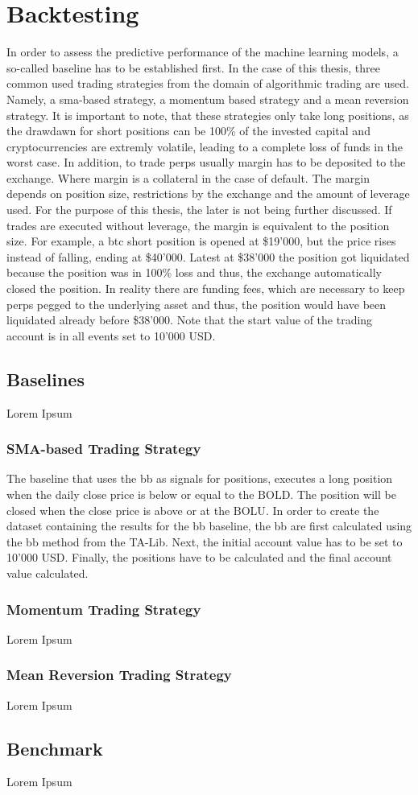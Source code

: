 \section{Backtesting}
\label{sec:Backtesting}
In order to assess the predictive performance of the machine learning models, a so-called baseline has to be established first. In the case of this thesis, three common used trading strategies from the domain of algorithmic trading are used. Namely, a sma-based strategy, a momentum based strategy and a mean reversion strategy. It is important to note, that these strategies only take long positions, as the drawdawn for short positions can be 100\% of the invested capital and cryptocurrencies are extremly volatile, leading to a complete loss of funds in the worst case. In addition, to trade perps usually margin has to be deposited to the exchange. Where margin is a collateral in the case of default. The margin depends on position size, restrictions by the exchange and the amount of leverage used. For the purpose of this thesis, the later is not being further discussed. If trades are executed without leverage, the margin is equivalent to the position size. For example, a \gls{btc} short position is opened at \$19'000, but the price rises instead of falling, ending at \$40'000. Latest at \$38'000 the position got liquidated because the position was in 100\% loss and thus, the exchange automatically closed the position. In reality there are funding fees, which are necessary to keep perps pegged to the underlying asset and thus, the position would have been liquidated already before \$38'000.
Note that the start value of the trading account is in all events set to 10'000 USD.

\subsection{Baselines}
\label{sub:Baselines}
Lorem Ipsum

\subsubsection{SMA-based Trading Strategy}
\label{subsub:BB_Baseline}
 The baseline that uses the \gls{bb} as signals for positions, executes a long position when the daily close price is below or equal to the $\text{BOLD}$. The position will be closed when the close price is above or at the $\text{BOLU}$. In order to create the dataset containing the results for the \gls{bb} baseline, the \gls{bb} are first calculated using the \gls{bb} method from the TA-Lib. Next, the initial account value has to be set to 10'000 USD. Finally, the positions have to be calculated and the final account value calculated.  

\subsubsection{Momentum Trading Strategy}
\label{subsub:RSI_Baseline}
Lorem Ipsum

\subsubsection{Mean Reversion Trading Strategy}
\label{sub:Global_Benchmark}
Lorem Ipsum

\subsection{Benchmark}
Lorem Ipsum
